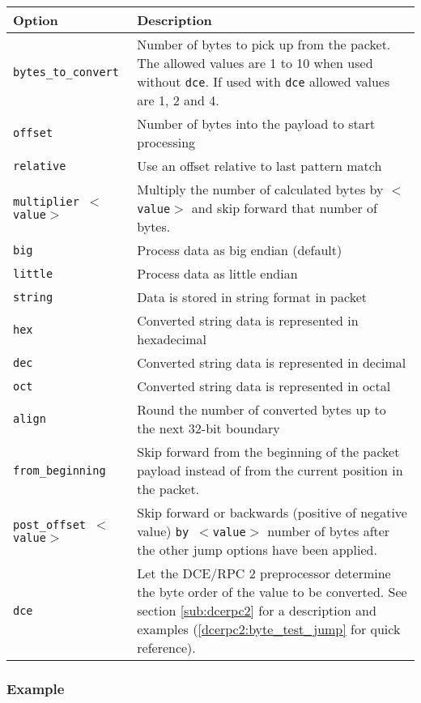 \documentclass[english]{report}
\begin{document}
\begin{tabular}{| l | p{4.5in} |}
\hline
{\bf Option} & {\bf Description}\\
\hline
\hline
\texttt{bytes\_to\_convert} &

Number of bytes to pick up from the packet. The allowed values are 1 to 10 when
used without \texttt{dce}. If used with \texttt{dce} allowed values are 1, 2 and 4.\\

\hline
\texttt{offset} & Number of bytes into the payload to start processing\\
\hline
\texttt{relative} & Use an offset relative to last pattern match\\
\hline
\texttt{multiplier $<$value$>$} & Multiply the number of calculated bytes by
\texttt{$<$value$>$} and skip forward that number of bytes.\\
\hline
\texttt{big} & Process data as big endian (default)\\
\hline
\texttt{little} & Process data as little endian\\
\hline
\texttt{string} & Data is stored in string format in packet\\
\hline
\texttt{hex} & Converted string data is represented in hexadecimal\\
\hline
\texttt{dec} & Converted string data is represented in decimal\\
\hline
\texttt{oct} & Converted string data is represented in octal\\
\hline
\texttt{align} & Round the number of converted bytes up to the next 32-bit boundary\\
\hline
\texttt{from\_beginning} & Skip forward from the beginning of the packet
payload instead of from the current position in the packet.\\
\hline
\texttt{post\_offset $<$value$>$} & Skip forward or backwards (positive of
negative value) \texttt{by $<$value$>$} number of bytes after the other jump
options have been applied.\\
\hline
\texttt{dce} & Let the DCE/RPC 2 preprocessor determine the byte order of the
value to be converted.  See section \ref{sub:dcerpc2} for a description and
examples (\ref{dcerpc2:byte_test_jump} for quick reference).\\ \hline
\end{tabular}

\subsubsection{Example}
\end{document}
